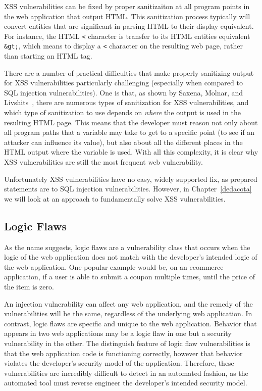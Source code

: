 XSS vulnerabilities can be fixed by proper sanitizaiton at all program
points in the web application that output HTML. This sanitization
process typically will convert entities that are significant in
parsing HTML to their display equivalent. For instance, the HTML
\texttt{<} character is transfer to its HTML entities equivalent
\texttt{\&gt;}, which means to display a \texttt{<} character on the
resulting web page, rather than starting an HTML tag.

There are a number of practical difficulties that make properly
sanitizing output for XSS vulnerabilities particularly challenging
(especially when compared to SQL injection vulnerabilities). One is
that, as shown by Saxena, Molnar, and
Livshits~\cite{saxena11:scriptgard}, there are numerous types of
sanitization for XSS vulnerabilities, and which type of sanitization
to use depends on \emph{where} the output is used in the resulting
HTML page. This means that the developer must reason not only about
all program paths that a variable may take to get to a specific point
(to see if an attacker can influence its value), but also about all
the different places in the HTML output where the variable is used.
With all this complexity, it is clear why XSS vulnerabilities are
still the most frequent web vulnerability. 

Unfortunately XSS vulnerabilities have no easy, widely supported fix,
as prepared statements are to SQL injection vulnerabilities. However,
in Chapter~\ref{dedacota} we will look at an approach to fundamentally
solve XSS vulnerabilities.

\subsection{Logic Flaws}

As the name suggests, logic flaws are a vulnerability class that
occurs when the logic of the web application does not match with the
developer's intended logic of the web application. One popular example
would be, on an ecommerce application, if a user is able to submit a
coupon multiple times, until the price of the item is zero. 

An injection vulnerability can affect any web application, and the
remedy of the vulnerabilities will be the same, regardless of the
underlying web application. In contrast, logic flaws are specific and
unique to the web application. Behavior that appears in two web
applications may be a logic flaw in one but a security vulnerability
in the other. The distinguish feature of logic flaw vulnerabilities is
that the web application code is functioning correctly, however that
behavior violates the developer's security model of the application.
Therefore, these vulnerabilities are incredibly difficult to detect in
an automated fashion, as the automated tool must reverse engineer the
developer's intended security model.

